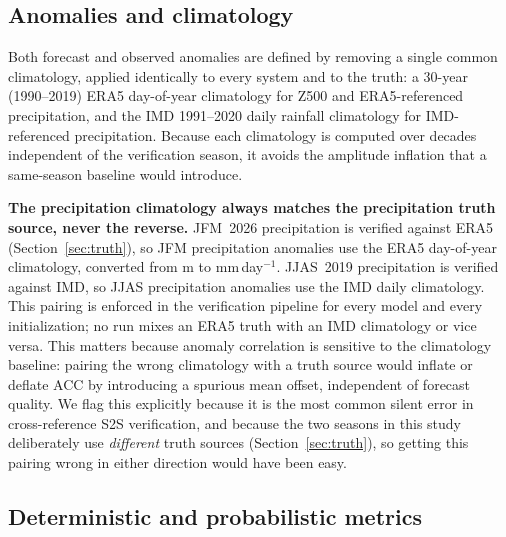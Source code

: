 \documentclass[11pt,a4paper]{article}
\begin{document}
\subsection{Anomalies and climatology}\label{sec:anom}

Both forecast and observed anomalies are defined by removing a single common
climatology, applied identically to every system and to the truth: a 30-year
(1990--2019) ERA5 day-of-year climatology for Z500 and ERA5-referenced
precipitation, and the IMD 1991--2020 daily rainfall climatology
\citep{pai2014} for IMD-referenced precipitation. Because each climatology is
computed over decades independent of the verification season, it avoids the
amplitude inflation that a same-season baseline would introduce.

\textbf{The precipitation climatology always matches the precipitation truth
source, never the reverse.} JFM~2026 precipitation is verified against ERA5
(Section~\ref{sec:truth}), so JFM precipitation anomalies use the ERA5
day-of-year climatology, converted from m to mm\,day$^{-1}$. JJAS~2019
precipitation is verified against IMD, so JJAS precipitation anomalies use the
IMD daily climatology. This pairing is enforced in the verification pipeline
for every model and every initialization; no run mixes an ERA5 truth with an
IMD climatology or vice versa. This matters because anomaly correlation is
sensitive to the climatology baseline: pairing the wrong climatology with a
truth source would inflate or deflate ACC by introducing a spurious mean
offset, independent of forecast quality. We flag this explicitly because it is
the most common silent error in cross-reference S2S verification, and because
the two seasons in this study deliberately use \emph{different} truth sources
(Section~\ref{sec:truth}), so getting this pairing wrong in either direction
would have been easy.

\subsection{Deterministic and probabilistic metrics}\label{sec:metrics}
\end{document}
